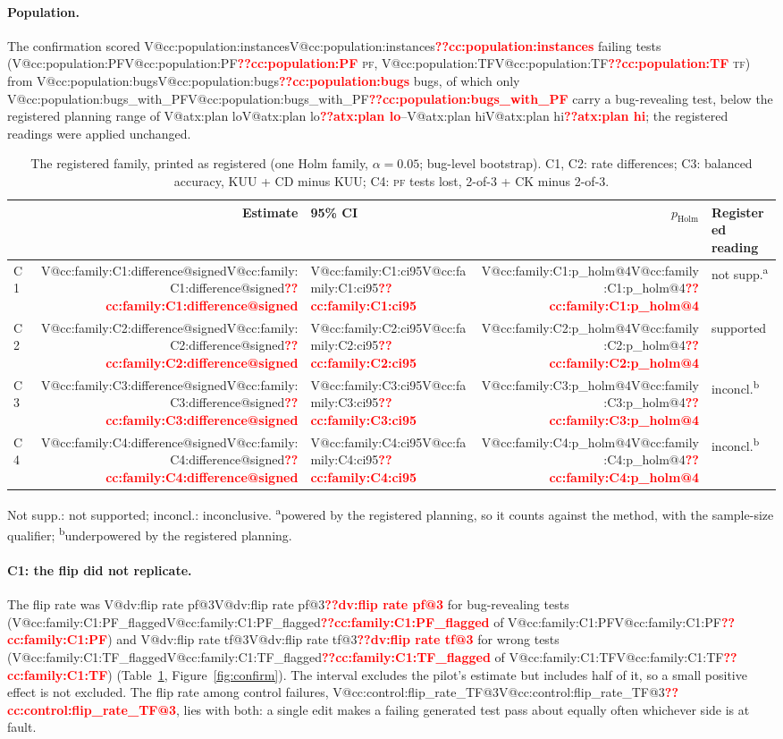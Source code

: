 \documentclass[journal]{IEEEtran}
\makeatletter
\newcommand{\V}[1]{\ifcsname V@#1\endcsname\csname V@#1\endcsname\else\textbf{\textcolor{red}{??#1}}\fi}
\newcommand{\PF}{\textsc{pf}}
\newcommand{\TF}{\textsc{tf}}
\makeatother
\begin{document}
\paragraph{Population.} The confirmation scored \V{cc:population:instances} failing tests (\V{cc:population:PF} \PF, \V{cc:population:TF} \TF) from \V{cc:population:bugs} bugs, of which only \V{cc:population:bugs_with_PF} carry a bug-revealing test, below the registered planning range of \V{atx:plan lo}--\V{atx:plan hi}; the registered readings were applied unchanged.

\begin{table}[t]
\caption{The registered family, printed as registered (one Holm family, $\alpha=0.05$; bug-level bootstrap). C1, C2: rate differences; C3: balanced accuracy, KUU + CD minus KUU; C4: \PF{} tests lost, 2-of-3 + CK minus 2-of-3.}\label{tab:family}
\scriptsize\setlength{\tabcolsep}{1.6pt}
\begin{tabular}{@{}l r l r l@{}}
\toprule
 & Estimate & 95\% CI & $p_\mathrm{Holm}$ & Registered reading \\
\midrule
C1 & \V{cc:family:C1:difference@signed} & \V{cc:family:C1:ci95} & \V{cc:family:C1:p_holm@4} & not supp.\textsuperscript{a} \\
C2 & \V{cc:family:C2:difference@signed} & \V{cc:family:C2:ci95} & \V{cc:family:C2:p_holm@4} & supported \\
C3 & \V{cc:family:C3:difference@signed} & \V{cc:family:C3:ci95} & \V{cc:family:C3:p_holm@4} & inconcl.\textsuperscript{b} \\
C4 & \V{cc:family:C4:difference@signed} & \V{cc:family:C4:ci95} & \V{cc:family:C4:p_holm@4} & inconcl.\textsuperscript{b} \\
\bottomrule
\end{tabular}
\par\smallskip\noindent\scriptsize Not supp.: not supported; inconcl.: inconclusive. \textsuperscript{a}powered by the registered planning, so it counts against the method, with the sample-size qualifier; \textsuperscript{b}underpowered by the registered planning.
\end{table}

\paragraph{C1: the flip did not replicate.} The flip rate was \V{dv:flip rate pf@3} for bug-revealing tests (\V{cc:family:C1:PF_flagged} of \V{cc:family:C1:PF}) and \V{dv:flip rate tf@3} for wrong tests (\V{cc:family:C1:TF_flagged} of \V{cc:family:C1:TF}) (Table~\ref{tab:family}, Figure~\ref{fig:confirm}). The interval excludes the pilot's estimate but includes half of it, so a small positive effect is not excluded. The flip rate among control failures, \V{cc:control:flip_rate_TF@3}, lies with both: a single edit makes a failing generated test pass about equally often whichever side is at fault.
\end{document}
